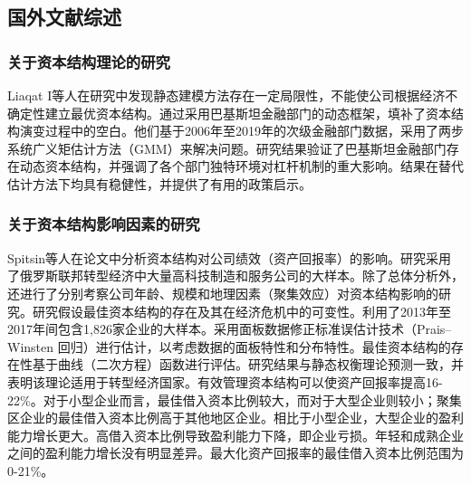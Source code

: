 


\subsection{国外文献综述}

\subsubsection{关于资本结构理论的研究}
Liaqat I等人在研究中发现静态建模方法存在一定局限性，不能使公司根据经济不确定性建立最优资本结构。通过采用巴基斯坦金融部门的动态框架，填补了资本结构演变过程中的空白。他们基于2006年至2019年的次级金融部门数据，采用了两步系统广义矩估计方法（GMM）来解决问题。研究结果验证了巴基斯坦金融部门存在动态资本结构，并强调了各个部门独特环境对杠杆机制的重大影响。结果在替代估计方法下均具有稳健性，并提供了有用的政策启示。\cite{Liaqat2021}
\subsubsection{关于资本结构影响因素的研究}
Spitsin等人在论文中分析资本结构对公司绩效（资产回报率）的影响。研究采用了俄罗斯联邦转型经济中大量高科技制造和服务公司的大样本。除了总体分析外，还进行了分别考察公司年龄、规模和地理因素（聚集效应）对资本结构影响的研究。研究假设最佳资本结构的存在及其在经济危机中的可变性。利用了2013年至2017年间包含1,826家企业的大样本。采用面板数据修正标准误估计技术（Prais–Winsten 回归）进行估计，以考虑数据的面板特性和分布特性。最佳资本结构的存在性基于曲线（二次方程）函数进行评估。研究结果与静态权衡理论预测一致，并表明该理论适用于转型经济国家。有效管理资本结构可以使资产回报率提高16-22\%。对于小型企业而言，最佳借入资本比例较大，而对于大型企业则较小；聚集区企业的最佳借入资本比例高于其他地区企业。相比于小型企业，大型企业的盈利能力增长更大。高借入资本比例导致盈利能力下降，即企业亏损。年轻和成熟企业之间的盈利能力增长没有明显差异。最大化资产回报率的最佳借入资本比例范围为0-21\%。\cite{Spitsin2020}

